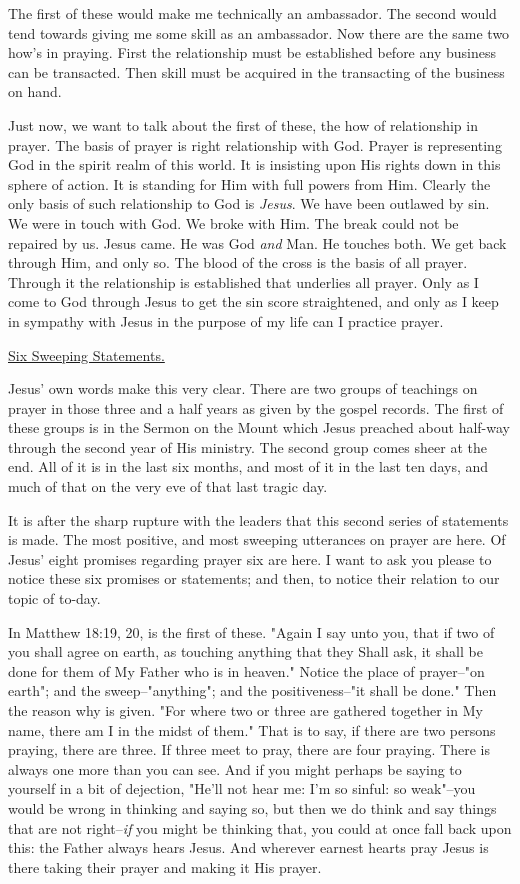 The first of these would make me technically an ambassador. The second
would tend towards giving me some skill as an ambassador. Now there are
the same two how's in praying. First the relationship must be established
before any business can be transacted. Then skill must be acquired in the
transacting of the business on hand.

Just now, we want to talk about the first of these, the how of
relationship in prayer. The basis of prayer is right relationship with
God. Prayer is representing God in the spirit realm of this world. It is
insisting upon His rights down in this sphere of action. It is standing
for Him with full powers from Him. Clearly the only basis of such
relationship to God is \textit{Jesus}. We have been outlawed by sin. We were in
touch with God. We broke with Him. The break could not be repaired by us.
Jesus came. He was God \textit{and} Man. He touches both. We get back through
Him, and only so. The blood of the cross is the basis of all prayer.
Through it the relationship is established that underlies all prayer. Only
as I come to God through Jesus to get the sin score straightened, and only
as I keep in sympathy with Jesus in the purpose of my life can I practice
prayer.



\underline{Six Sweeping Statements.}


Jesus' own words make this very clear. There are two groups of teachings
on prayer in those three and a half years as given by the gospel records.
The first of these groups is in the Sermon on the Mount which Jesus
preached about half-way through the second year of His ministry. The
second group comes sheer at the end. All of it is in the last six months,
and most of it in the last ten days, and much of that on the very eve of
that last tragic day.

It is after the sharp rupture with the leaders that this second series of
statements is made. The most positive, and most sweeping utterances on
prayer are here. Of Jesus' eight promises regarding prayer six are here. I
want to ask you please to notice these six promises or statements; and
then, to notice their relation to our topic of to-day.

In Matthew 18:19, 20, is the first of these. "Again I say unto you, that
if two of you shall agree on earth, as touching anything that they Shall
ask, it shall be done for them of My Father who is in heaven." Notice the
place of prayer--"on earth"; and the sweep--"anything"; and the
positiveness--"it shall be done." Then the reason why is given. "For where
two or three are gathered together in My name, there am I in the midst of
them." That is to say, if there are two persons praying, there are three.
If three meet to pray, there are four praying. There is always one more
than you can see. And if you might perhaps be saying to yourself in a bit
of dejection, "He'll not hear me: I'm so sinful: so weak"--you would be
wrong in thinking and saying so, but then we do think and say things that
are not right--\textit{if} you might be thinking that, you could at once fall
back upon this: the Father always hears Jesus. And wherever earnest hearts
pray Jesus is there taking their prayer and making it His prayer.

